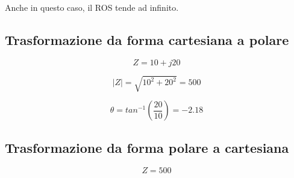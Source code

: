 \documentclass{article}
\begin{document}
    Anche in questo caso, il ROS tende ad infinito.
    
    \subsection{Trasformazione da forma cartesiana a polare}

    \begin{equation}
        Z = 10 + j20
    \end{equation}

    \begin{equation}
        |Z| = \sqrt{10^2 + 20^2} = 500
    \end{equation}

    \begin{equation}
        \theta = tan^{-1}(\frac{20}{10}) = -2.18
    \end{equation}

    \subsection{Trasformazione da forma polare a cartesiana}

    \begin{equation}
        Z = 500 
    \end{equation}
\end{document}

